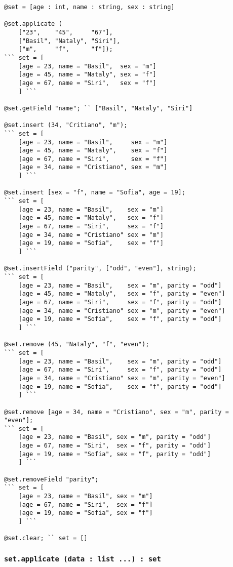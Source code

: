 \begin{lstlisting}[caption=Методы класса set, label=setmethods]
@set = [age : int, name : string, sex : string]

@set.applicate (
	["23",    "45",     "67"],
	["Basil", "Nataly", "Siri"],
	["m",     "f",      "f"]);
``` set = [
    [age = 23, name = "Basil",  sex = "m"]
	[age = 45, name = "Nataly", sex = "f"]
	[age = 67, name = "Siri",   sex = "f"]
	] ```

@set.getField "name"; `` ["Basil", "Nataly", "Siri"]

@set.insert (34, "Critiano", "m");
``` set = [
    [age = 23, name = "Basil",     sex = "m"]
	[age = 45, name = "Nataly",    sex = "f"]
	[age = 67, name = "Siri",      sex = "f"]
	[age = 34, name = "Cristiano", sex = "m"]
	] ```

@set.insert [sex = "f", name = "Sofia", age = 19];
``` set = [
    [age = 23, name = "Basil",    sex = "m"]
	[age = 45, name = "Nataly",   sex = "f"]
	[age = 67, name = "Siri",     sex = "f"]
	[age = 34, name = "Cristiano" sex = "m"]
	[age = 19, name = "Sofia",    sex = "f"]
	] ```

@set.insertField ("parity", ["odd", "even"], string);
``` set = [
    [age = 23, name = "Basil",    sex = "m", parity = "odd"]
	[age = 45, name = "Nataly",   sex = "f", parity = "even"]
	[age = 67, name = "Siri",     sex = "f", parity = "odd"]
	[age = 34, name = "Cristiano" sex = "m", parity = "even"]
	[age = 19, name = "Sofia",    sex = "f", parity = "odd"]
	] ```

@set.remove (45, "Nataly", "f", "even");
``` set = [
    [age = 23, name = "Basil",    sex = "m", parity = "odd"]
	[age = 67, name = "Siri",     sex = "f", parity = "odd"]
	[age = 34, name = "Cristiano" sex = "m", parity = "even"]
	[age = 19, name = "Sofia",    sex = "f", parity = "odd"]
	] ```

@set.remove [age = 34, name = "Cristiano", sex = "m", parity = "even"];
``` set = [
    [age = 23, name = "Basil", sex = "m", parity = "odd"]
	[age = 67, name = "Siri",  sex = "f", parity = "odd"]
	[age = 19, name = "Sofia", sex = "f", parity = "odd"]
	] ```

@set.removeField "parity";
``` set = [
    [age = 23, name = "Basil", sex = "m"]
	[age = 67, name = "Siri",  sex = "f"]
	[age = 19, name = "Sofia", sex = "f"]
	] ```

@set.clear; `` set = []
\end{lstlisting}

\subsubsection{\lstinline|set.applicate (data : list ...) : set|}

